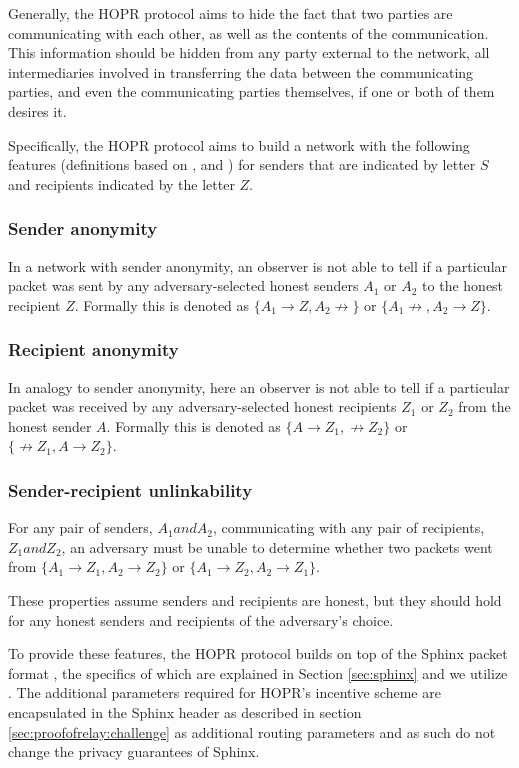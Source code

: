 Generally, the HOPR protocol aims to hide the fact that two parties are communicating with each other, as well as the contents of the communication. This information should be hidden from any party external to the network, all intermediaries involved in transferring the data between the communicating parties, and even the communicating parties themselves, if one or both of them desires it.

Specifically, the HOPR protocol aims to build a network with the following features (definitions based on \cite{AnoA}, \cite{loopix} and \cite{sphinxpaper}) for senders that are indicated by letter $S$ and recipients indicated by the letter $Z$.

\subsubsection{Sender anonymity}
In a network with sender anonymity, an observer is not able to tell if a particular packet was sent by any adversary-selected honest senders $A_1$ or $A_2$ to the honest recipient $Z$. Formally this is denoted as $\{A_1 \rightarrow Z, A_2 \not\rightarrow \}$ or $\{A_1 \not\rightarrow, A_2 \rightarrow Z \}$.

\subsubsection{Recipient anonymity}
In analogy to sender anonymity, here an observer is not able to tell if a particular packet was received by any adversary-selected honest recipients $Z_1$ or $Z_2$ from the honest sender $A$. Formally this is denoted as $\{A \rightarrow Z_1, \not\rightarrow Z_2 \}$ or $\{\not\rightarrow Z_1, A \rightarrow Z_2 \}$.



\subsubsection{Sender-recipient unlinkability}
For any pair of senders, $A_1 and A_2$, communicating with any pair of recipients, $Z_1 and Z_2$, an adversary must be unable to determine whether two packets went from $\{A_1 \rightarrow Z_1, A_2 \rightarrow Z_2 \}$ or $\{A_1 \rightarrow Z_2, A_2 \rightarrow Z_1 \}$.


These properties assume senders and recipients are honest, but they should hold for any honest senders and recipients of the adversary's choice.

To provide these features, the HOPR protocol builds on top of the Sphinx packet format \cite{sphinxpaper}, the specifics of which are explained in Section \ref{sec:sphinx} and we utilize . The additional parameters required for HOPR's incentive scheme are encapsulated in the Sphinx header as described in section \ref{sec:proofofrelay:challenge} as additional routing parameters and as such do not change the privacy guarantees of Sphinx.



